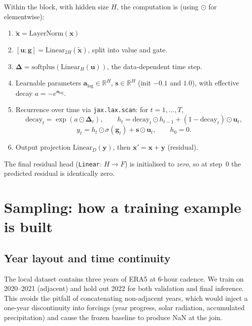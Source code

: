 \documentclass[11pt,a4paper]{article}
\begin{document}
Within the block, with hidden size $H$, the computation is (using $\odot$ for elementwise):
\begin{enumerate}[nosep]
  \item $\tilde{\mathbf{x}} = \text{LayerNorm}(\mathbf{x})$
  \item $[\mathbf{u};\mathbf{g}] = \text{Linear}_{2H}(\tilde{\mathbf{x}})$, split into value and gate.
  \item $\boldsymbol\Delta = \text{softplus}(\text{Linear}_H(\mathbf{u}))$, the data-dependent time step.
  \item Learnable parameters $\mathbf{a}_{\log}\in\mathbb{R}^H$, $\mathbf{s}\in\mathbb{R}^H$ (init $-0.1$ and $1.0$), with effective decay $a = -e^{\mathbf{a}_{\log}}$.
  \item Recurrence over time via \texttt{jax.lax.scan}: for $t = 1,\dots,T$,
  \[
  \text{decay}_t = \exp(a \odot \boldsymbol\Delta_t), \qquad h_t = \text{decay}_t \odot h_{t-1} + (1-\text{decay}_t)\odot \mathbf{u}_t,
  \]
  \[
  y_t = h_t \odot \sigma(\mathbf{g}_t) + \mathbf{s} \odot \mathbf{u}_t, \qquad h_0 = 0.
  \]
  \item Output projection $\text{Linear}_D(\mathbf{y})$, then $\mathbf{x}' = \mathbf{x} + \mathbf{y}$ (residual).
\end{enumerate}
The final residual head (\texttt{Linear}: $H{\to}F$) is initialised to \emph{zero}, so at step~0 the predicted residual is identically zero.

\section{Sampling: how a training example is built}

\subsection{Year layout and time continuity}

The local dataset contains three years of ERA5 at 6-hour cadence. We train on 2020--2021 (adjacent) and hold out 2022 for both validation and final inference. This avoids the pitfall of concatenating non-adjacent years, which would inject a one-year discontinuity into forcings (year progress, solar radiation, accumulated precipitation) and cause the frozen baseline to produce NaN at the join.
\end{document}
